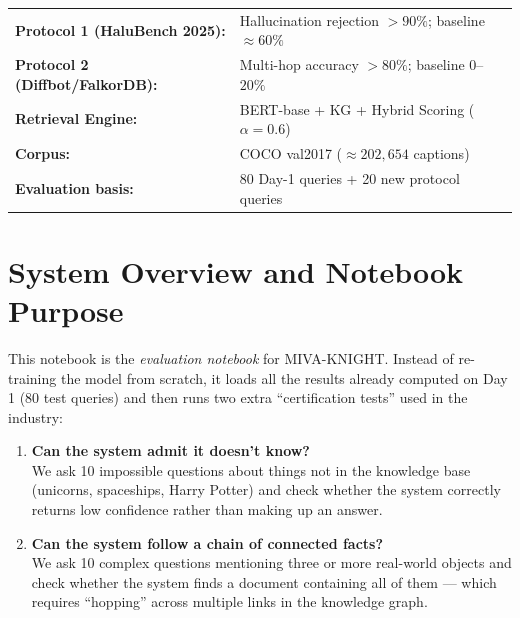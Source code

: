 \documentclass[12pt,a4paper]{article}
\theoremstyle{definition}
\theoremstyle{plain}
\theoremstyle{remark}
\begin{document}
\begin{titlepage}
\begin{center}
\renewcommand{\arraystretch}{1.35}
\begin{tabular}{@{}ll@{}}
  \textbf{Protocol 1 (HaluBench 2025):}   &
      Hallucination rejection $>90\%$; baseline $\approx60\%$ \\
  \textbf{Protocol 2 (Diffbot/FalkorDB):} &
      Multi-hop accuracy $>80\%$; baseline $0$--$20\%$ \\
  \textbf{Retrieval Engine:}              &
      BERT-base + KG + Hybrid Scoring ($\alpha=0.6$) \\
  \textbf{Corpus:}                        &
      COCO val2017 ($\approx\!202{,}654$ captions) \\
  \textbf{Evaluation basis:}              &
      80 Day-1 queries + 20 new protocol queries \\
\end{tabular}
\end{center}

\vfill
\end{titlepage}

\tableofcontents
\newpage

\section{System Overview and Notebook Purpose}

\begin{tcolorbox}[laymanbox]
This notebook is the \emph{evaluation notebook} for MIVA-KNIGHT. Instead of
re-training the model from scratch, it loads all the results already computed
on Day 1 (80 test queries) and then runs two extra ``certification tests'' used
in the industry:
\begin{enumerate}
  \item \textbf{Can the system admit it doesn't know?}\\
        We ask 10 impossible questions about things not in the knowledge base
        (unicorns, spaceships, Harry Potter) and check whether the system
        correctly returns low confidence rather than making up an answer.
  \item \textbf{Can the system follow a chain of connected facts?}\\
        We ask 10 complex questions mentioning three or more real-world objects
        and check whether the system finds a document containing all of them
        --- which requires ``hopping'' across multiple links in the knowledge graph.
\end{enumerate}
\end{tcolorbox}
\end{document}

